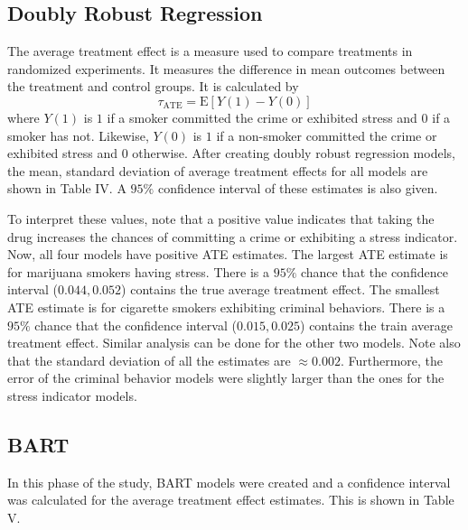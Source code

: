 \documentclass[a4paper, 10pt, conference]{ieeeconf}
\begin{document}
\subsection{Doubly Robust Regression}
The average treatment effect is a measure used to compare treatments in randomized experiments. It measures the difference in mean outcomes between the treatment and control groups. It is calculated by 
 $$ \tau_{\text{ATE}} = \mathrm{E}[Y(1) - Y(0)] $$ where $Y(1)$ is $1$ if a smoker committed the crime or exhibited stress and $0$ if a smoker has not. Likewise, $Y(0)$ is $1$ if a non-smoker committed the crime or exhibited stress and $0$ otherwise. After creating doubly robust regression models, the mean, standard deviation of average treatment effects for all models are shown in Table IV. A $95\%$ confidence interval of these estimates is also given. 


To interpret these values, note that a positive value indicates that taking the drug increases the chances of committing a crime or exhibiting a stress indicator. Now, all four models have positive ATE estimates. The largest ATE estimate is for marijuana smokers having stress. There is a $95\%$ chance that the confidence interval ($0.044, 0.052$) contains the true average treatment effect. The smallest ATE estimate is for cigarette smokers exhibiting criminal behaviors. There is a $95\%$ chance that the confidence interval ($0.015, 0.025$) contains the train average treatment effect. Similar analysis can be done for the other two models. Note also that the standard deviation of all the estimates are $\approx 0.002$. Furthermore, the error of the criminal behavior models were slightly larger than the ones for the stress indicator models. 

\subsection{BART}
In this phase of the study, BART models were created and a confidence interval was calculated for the average treatment effect estimates. This is shown in Table V. 

\end{document}

